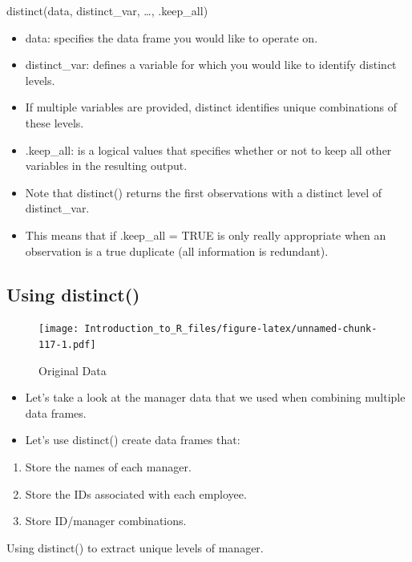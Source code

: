 \documentclass[]{book}
\providecommand{\tightlist}{%
  \setlength{\itemsep}{0pt}\setlength{\parskip}{0pt}}
\theoremstyle{definition}
\theoremstyle{definition}
\theoremstyle{definition}
\theoremstyle{remark}
\let\BeginKnitrBlock\begin \let\EndKnitrBlock\end
\begin{document}
distinct(data, distinct\_var, \ldots{}, .keep\_all)

\begin{itemize}
\tightlist
\item
  data: specifies the data frame you would like to operate on.
\item
  distinct\_var: defines a variable for which you would like to identify distinct levels.
\item
  If multiple variables are provided, distinct identifies unique combinations of these levels.
\item
  .keep\_all: is a logical values that specifies whether or not to keep all other variables in the resulting output.
\item
  Note that distinct() returns the first observations with a distinct level of distinct\_var.
\item
  This means that if .keep\_all = TRUE is only really appropriate when an observation is a true duplicate (all information is redundant).
\end{itemize}

\hypertarget{using-distinct}{%
\subsection{Using distinct()}\label{using-distinct}}

\begin{figure}
\centering
\texttt{[image: Introduction\_to\_R\_files/figure-latex/unnamed-chunk-117-1.pdf]}
\caption{\label{fig:unnamed-chunk-117}Original Data}
\end{figure}

\begin{itemize}
\tightlist
\item
  Let's take a look at the manager data that we used when combining multiple data frames.
\item
  Let's use distinct() create data frames that:
\end{itemize}

\begin{enumerate}
\def\labelenumi{\arabic{enumi}.}
\tightlist
\item
  Store the names of each manager.
\item
  Store the IDs associated with each employee.
\item
  Store ID/manager combinations.
\end{enumerate}

\BeginKnitrBlock{example}
\protect\hypertarget{exm:distinct1}{}{\label{exm:distinct1} }Using distinct() to extract unique levels of manager.
\EndKnitrBlock{example}
\end{document}
